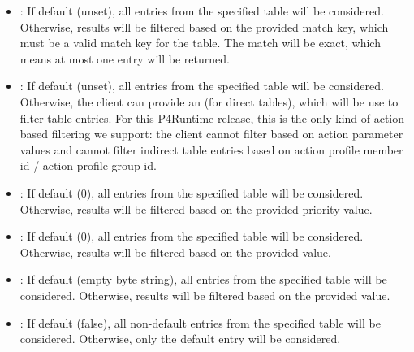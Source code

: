 \documentclass[11pt]{article}
\begin{document}
{\begin{itemize}[noitemsep,topsep=\mdcompacttopsep]
\item{}: If default (unset), all entries from the specified table will be
considered. Otherwise, results will be filtered based on the provided match
key, which must be a valid match key for the table. The match will be exact,
which means at most one entry will be returned.%

\item{}: If default (unset), all entries from the specified table will be
considered. Otherwise, the client can provide an  (for direct
tables), which will be use to filter table entries. For this P4Runtime
release, this is the only kind of action-based filtering we support: the
client cannot filter based on action parameter values and cannot filter
indirect table entries based on action profile member id / action profile
group id.%

\item{}: If default (0), all entries from the specified table will be
considered. Otherwise, results will be filtered based on the provided priority
value.%

\item{}: If default (0), all entries from the specified table
will be considered. Otherwise, results will be filtered based on the provided
 value.%

\item{}: If default (empty byte string), all entries from the specified
table will be considered. Otherwise, results will be filtered based on the
provided  value.%

\item{}: If default (false), all non-default entries from the
specified table will be considered. Otherwise, only the default entry will be
considered.%


\end{itemize}}
\end{document}
